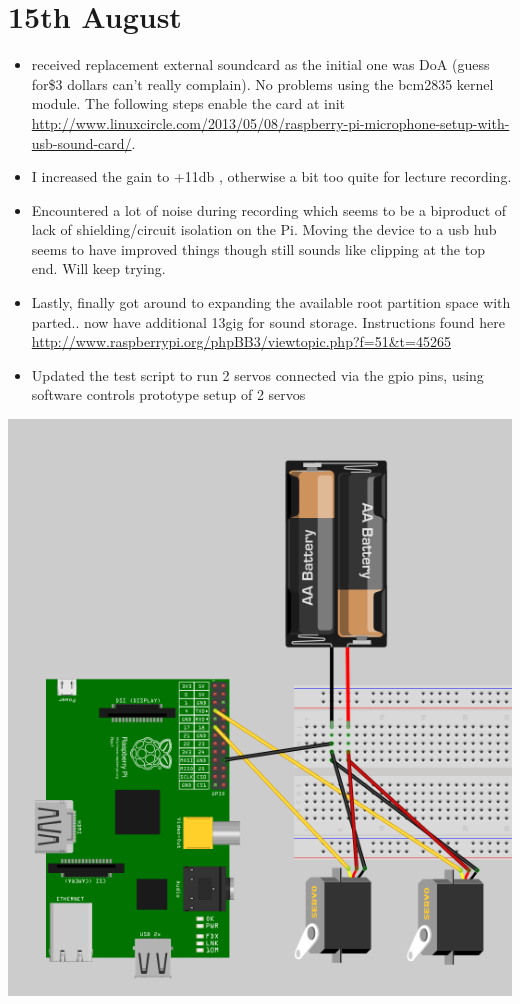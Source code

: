 \section*{15th August}

\begin{itemize}
  \item received replacement external soundcard as the initial one was DoA (guess for\$3 dollars can't really complain). No problems using the bcm2835 kernel module. The following steps enable the card at init \url{http://www.linuxcircle.com/2013/05/08/raspberry-pi-microphone-setup-with-usb-sound-card/}.
  \item I increased the gain to +11db , otherwise a bit too quite for lecture recording.
  \item Encountered a lot of noise during recording which seems to be a biproduct of lack of shielding/circuit isolation on the Pi. Moving the device to a usb hub seems to have improved things though still sounds like clipping at the top end. Will keep trying.
  \item Lastly, finally got around to expanding the available root partition space with parted.. now have additional 13gig for sound storage. Instructions found here \url{http://www.raspberrypi.org/phpBB3/viewtopic.php?f=51&t=45265}
  \item Updated the test script to run 2 servos connected via the gpio pins, using software controls
prototype setup of 2 servos
\end{itemize}


\includegraphics[width=\textwidth]{graphs/proto2.png}

